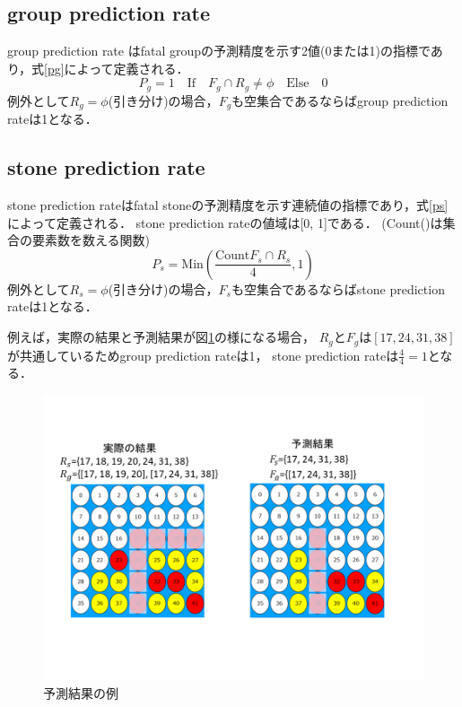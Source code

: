 \subsection{group prediction rate}
group prediction rate はfatal groupの予測精度を示す2値(0または1)の指標であり，式\ref{pg}によって定義される．
\begin{equation}
    \label{pg}
	{P_g = 1 \quad \textrm{If} \quad F_g \cap R_g \ne \phi \quad \textrm{Else} \quad 0}
\end{equation}
例外として$R_g=\phi$(引き分け)の場合，$F_g$も空集合であるならばgroup prediction rateは1となる．
\subsection{stone prediction rate}
stone prediction rateはfatal stoneの予測精度を示す連続値の指標であり，式\ref{ps}によって定義される．
stone prediction rateの値域は[0, 1]である．
(Count()は集合の要素数を数える関数)
\begin{equation}
    \label{ps}
	{P_s = \textrm{Min}(\frac{\textrm{Count}F_s \cap R_s}{4}, 1)  }
\end{equation}
例外として$R_s=\phi$(引き分け)の場合，$F_s$も空集合であるならばstone prediction rateは1となる．


例えば，実際の結果と予測結果が図\ref{fig:cal-compare}の様になる場合， $R_g$と$F_g$は$[17, 24, 31, 38]$が共通しているためgroup prediction rateは1， stone prediction rateは$\frac{4}{4}=1$となる．
\pagebreak
\begin{figure}[htbp]
	\centering
	\includegraphics[width=\linewidth]{./figure/cal-compare.png}
	\caption{予測結果の例}
	\label{fig:cal-compare}
\end{figure}


